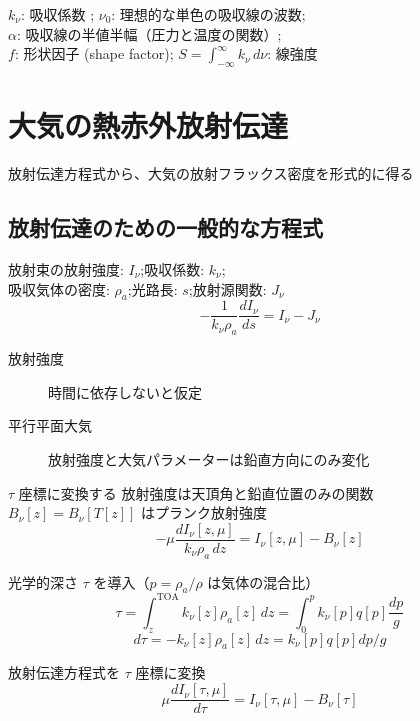 \documentclass[article]{dennou777}
\begin{document}
$k_\nu$: 吸収係数 ;\quad
$\nu_0$: 理想的な単色の吸収線の波数;\\
$\alpha$: 吸収線の半値半幅（圧力と温度の関数）;\\
$f$: 形状因子 (shape factor);\quad
$\displaystyle S=\int^\infty_{-\infty}k_\nu\,d\nu$: 線強度

\section{大気の熱赤外放射伝達}
放射伝達方程式から、大気の放射フラックス密度を形式的に得る


\subsection{放射伝達のための一般的な方程式}
放射束の放射強度: $I_\nu$;\quad 吸収係数: $k_\nu$;\\
吸収気体の密度: $\rho_a$;\quad 光路長: $s$;\quad 放射源関数: $J_\nu$
\begin{equation}
	-\frac{1}{k_\nu \rho_a}\frac{dI_\nu}{ds}=I_\nu-J_\nu
\end{equation}

\begin{description}
	\item[放射強度] 時間に依存しないと仮定
	\item[平行平面大気] 放射強度と大気パラメーターは鉛直方向にのみ変化
\end{description}

$\tau$ 座標に変換する
放射強度は天頂角と鉛直位置のみの関数\\
$B_\nu[z]=B_\nu[T[z]]$ はプランク放射強度
\begin{equation}
	-\mu\frac{dI_\nu[z,\mu]}{k_\nu\rho_a\,dz}=I_\nu[z,\mu]-B_\nu[z]
\end{equation}

光学的深さ $\tau$ を導入（$p=\rho_a/\rho$ は気体の混合比）
\begin{equation}
	\tau=\int^{\mathrm{TOA}}_{z} k_\nu[z]\rho_a[z]\,dz=\int^p_0 k_\nu[p]q[p]\frac{dp}{g}
\end{equation}
\begin{equation}
	d\tau=-k_\nu[z]\rho_a[z]\,dz=k_\nu[p]q[p]dp/g
\end{equation}

放射伝達方程式を $\tau$ 座標に変換
\begin{equation}
	\mu\frac{dI_\nu[\tau,\mu]}{d\tau}=I_\nu[\tau,\mu]-B_\nu[\tau]
\end{equation}
\end{document}
